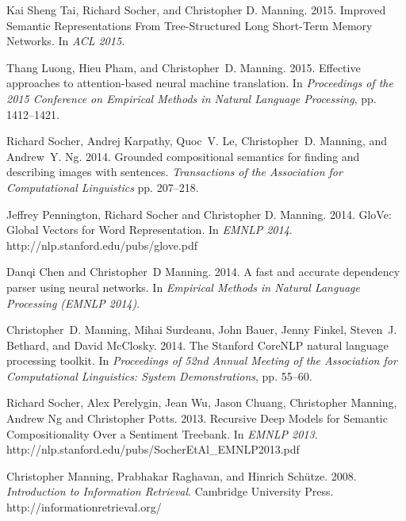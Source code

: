 \documentclass[11pt]{article}
\def\url#1{{\small\sf #1}}
\begin{document}
\begin{vita}
\begin{Important Recent Publications}
\item Kai Sheng Tai, Richard Socher, and Christopher
  D. Manning. 2015. Improved Semantic Representations From
  Tree-Structured Long Short-Term Memory Networks. In
  \emph{ACL 2015.}

\item Thang Luong, Hieu Pham, and Christopher~D. Manning. 2015. Effective approaches to attention-based neural machine translation.
\newblock In {\em Proceedings of the 2015 Conference on Empirical Methods in                                                                          
 Natural Language Processing}, pp. 1412--1421.

\item Richard Socher, Andrej Karpathy, Quoc~V. Le, Christopher~D. Manning, and
  Andrew~Y. Ng.
2014.
Grounded compositional semantics for finding and describing images
  with sentences.
{\em Transactions of the Association for Computational Linguistics}
  pp. 207--218.

\item Jeffrey Pennington, Richard Socher and Christopher D. Manning. 2014.
GloVe: Global Vectors for Word Representation. In \emph{EMNLP 2014}. \url{http://nlp.stanford.edu/pubs/glove.pdf}

\item Danqi Chen and Christopher~D Manning.
2014.
A fast and accurate dependency parser using neural networks.
In {\em Empirical Methods in Natural Language Processing (EMNLP 2014)}.

\end{Important Recent Publications}


\begin{Other Key Publications}

\item Christopher~D. Manning, Mihai Surdeanu, John Bauer, Jenny Finkel, Steven~J.
  Bethard, and David McClosky.
2014.
The {Stanford} {CoreNLP} natural language processing toolkit.
In {\em Proceedings of 52nd Annual Meeting of the Association for
  Computational Linguistics: System Demonstrations}, pp. 55--60.

\item Richard Socher, Alex Perelygin, Jean Wu,  Jason Chuang,
  Christopher Manning, Andrew Ng and Christopher Potts. 2013.
Recursive Deep Models for Semantic Compositionality Over a Sentiment
Treebank. In \emph{EMNLP 2013}. \url{http://nlp.stanford.edu/pubs/SocherEtAl\_EMNLP2013.pdf}


\item Christopher Manning, Prabhakar Raghavan, and Hinrich Sch\"utze. 2008. \emph{Introduction to Information Retrieval}.  Cambridge University Press.
\url{http://informationretrieval.org/}


\end{Other Key Publications}
\end{vita}
\end{document}
